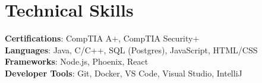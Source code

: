 \documentclass[letterpaper,11pt]{article}
\begin{document}
%
\section{Technical Skills}
 \begin{itemize}[leftmargin=0.15in, label={}]
    \small{\item{
     \textbf{Certifications}{: CompTIA A+, CompTIA Security+} \\
     \textbf{Languages}{: Java, C/C++, SQL (Postgres), JavaScript, HTML/CSS} \\
     \textbf{Frameworks}{: Node.js, Phoenix, React} \\
     \textbf{Developer Tools}{: Git, Docker, VS Code, Visual Studio, IntelliJ}
    }}
 \end{itemize}


\end{document}
